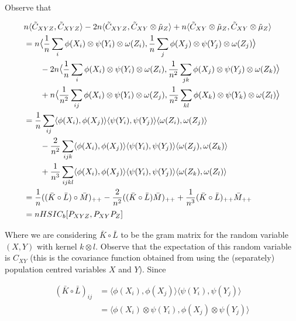 \documentclass{article}
\begin{document}
Observe that 

\begin{align*}
& n\langle \tilde{C}_{XYZ},\tilde{C}_{XYZ} \rangle  - 2n\langle \tilde{C}_{XYZ},\tilde{C}_{XY}\otimes\tilde{\mu}_Z \rangle + n\langle \tilde{C}_{XY}\otimes\tilde{\mu}_Z,\tilde{C}_{XY}\otimes\tilde{\mu}_Z \rangle \\&= 
n\mathlarger{\langle} \frac{1}{n}\sum_i\phi(X_i)\otimes\psi(Y_i)\otimes\omega(Z_i),\frac{1}{n}\sum_j\phi(X_j)\otimes\psi(Y_j)\otimes\omega(Z_j) \mathlarger{\rangle} \\&\quad \quad - 2n\mathlarger{\langle} \frac{1}{n}\sum_i\phi(X_i)\otimes\psi(Y_i)\otimes\omega(Z_i),\frac{1}{n^2}\sum_{jk}\phi(X_j)\otimes\psi(Y_j)\otimes\omega(Z_k) \mathlarger{\rangle} \\&\quad\quad + n\mathlarger{\langle} \frac{1}{n^2}\sum_{ij}\phi(X_i)\otimes\psi(Y_i)\otimes\omega(Z_j),\frac{1}{n^2}\sum_{kl}\phi(X_k)\otimes\psi(Y_k)\otimes\omega(Z_l) \mathlarger{\rangle}\\&=
\frac{1}{n}\sum_{ij}\langle\phi(X_i),\phi(X_j)\rangle\langle\psi(Y_i),\psi(Y_j)\rangle\langle\omega(Z_i),\omega(Z_j)\rangle \\&\quad\quad -
\frac{2}{n^2}\sum_{ijk}\langle\phi(X_i),\phi(X_j)\rangle\langle\psi(Y_i),\psi(Y_j)\rangle\langle\omega(Z_j),\omega(Z_k)\rangle \\&\quad \quad +
\frac{1}{n^3}\sum_{ijkl}\langle\phi(X_i),\phi(X_j)\rangle\langle\psi(Y_i),\psi(Y_j)\rangle\langle\omega(Z_k),\omega(Z_l)\rangle \\ &=
\frac{1}{n}((\bar{K}\circ \bar{L}) \circ \bar{M})_{++} - \frac{2}{n^2}((\bar{K}\circ \bar{L})\bar{M})_{++} + \frac{1}{n^3}(\bar{K}\circ \bar{L})_{++}\bar{M}_{++}\\&=
nHSIC_b[P_{XYZ},P_{XY}P_Z]
\end{align*}



Where we are considering $\bar{K}\circ \bar{L}$ to be the gram matrix for the random variable $(X,Y)$ with kernel $k\otimes l$. Observe that the expectation of this random variable is $C_{XY}$ (this is the covariance function obtained from using the (separately) population centred variables $X$ and $Y$). Since 

\begin{align*}
(\bar{K}\circ\bar{L})_{ij} &= \langle\phi(X_i),\phi(X_j)\rangle\langle\psi(Y_i),\psi(Y_j)\rangle \\ &=
\langle\phi(X_i)\otimes \psi(Y_i),\phi(X_j)\otimes\psi(Y_j)\rangle
\end{align*}
\end{document}
